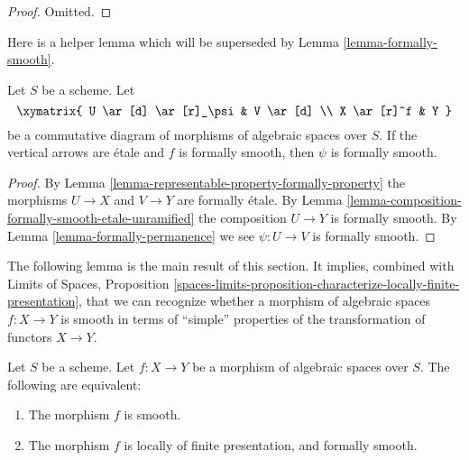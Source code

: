 \begin{proof}
Omitted.
\end{proof}

\noindent
Here is a helper lemma which will be superseded by
Lemma \ref{lemma-formally-smooth}.

\begin{lemma}
\label{lemma-helper-formally-smooth}
Let $S$ be a scheme. Let
$$
\xymatrix{
U \ar[d] \ar[r]_\psi & V \ar[d] \\
X \ar[r]^f & Y
}
$$
be a commutative diagram of morphisms of algebraic spaces over $S$.
If the vertical arrows are \'etale and $f$ is formally smooth, then
$\psi$ is formally smooth.
\end{lemma}

\begin{proof}
By
Lemma \ref{lemma-representable-property-formally-property}
the morphisms $U \to X$ and $V \to Y$ are formally \'etale. By
Lemma \ref{lemma-composition-formally-smooth-etale-unramified}
the composition $U \to Y$ is formally smooth. By
Lemma \ref{lemma-formally-permanence}
we see $\psi : U \to V$ is formally smooth.
\end{proof}

\noindent
The following lemma is the main result of this section.
It implies, combined with
Limits of Spaces, Proposition
\ref{spaces-limits-proposition-characterize-locally-finite-presentation},
that we can recognize whether a morphism of algebraic spaces
$f : X \to Y$ is smooth in terms of ``simple'' properties of the
transformation of functors $X \to Y$.

\begin{lemma}
\label{lemma-smooth-formally-smooth}
Let $S$ be a scheme.
Let $f : X \to Y$ be a morphism of algebraic spaces over $S$.
The following are equivalent:
\begin{enumerate}
\item The morphism $f$ is smooth.
\item The morphism $f$ is locally of finite presentation, and
formally smooth.
\end{enumerate}
\end{lemma}

